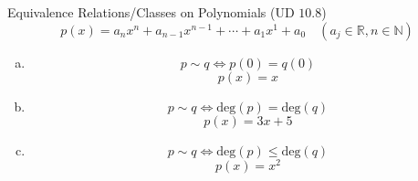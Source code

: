 \begin{frame}{}
  \begin{exampleblock}{Equivalence Relations/Classes on Polynomials (UD $10.8$)}
    \[
      p(x) = a_n x^n + a_{n-1} x^{n-1} + \cdots + a_1 x^1 + a_0 \quad (a_j \in \mathbb{R}, n \in \mathbb{N})
    \]

    \begin{enumerate}[(a)]
      \item 
	\[
	  p \sim q \iff p(0) = q(0)
	\]
	\[
	  p(x) = x
	\]
      \item 
	\[
	  p \sim q \iff \text{deg}(p) = \text{deg}(q)
	\]
	\[
	  p(x) = 3x + 5
	\]
      \item 
	\[
	  p \sim q \iff \text{deg}(p) \le \text{deg}(q)
	\]
        \[
	  p(x) = x^2
	\]
    \end{enumerate}
  \end{exampleblock}
\end{frame}
